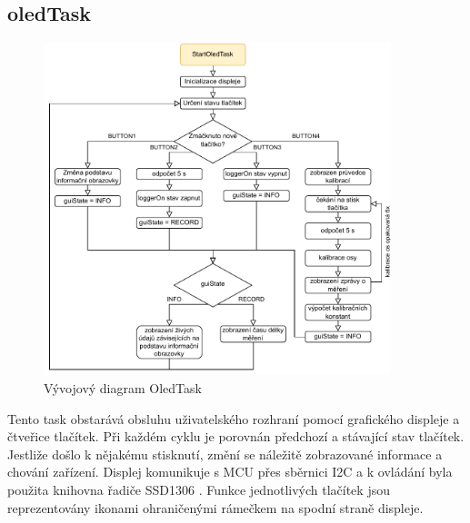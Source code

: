 \subsection{oledTask}
\begin{figure}[h]
    \centering
    \includegraphics[width=0.9\textwidth]{obrazky/OledTask}
    \caption{Vývojový diagram OledTask}
\end{figure}
Tento task obstarává obsluhu uživatelského rozhraní pomocí grafického displeje a čtveřice tlačítek. Při každém cyklu
je porovnán předchozí a stávající stav tlačítek. Jestliže došlo k nějakému stisknutí, změní se náležitě zobrazované informace a chování zařízení. Displej komunikuje s \ac{MCU} přes sběrnici I2C a k ovládání byla použita knihovna řadiče SSD1306 \cite{Alekseev2024}. Funkce jednotlivých tlačítek jsou reprezentovány ikonami ohraničenými rámečkem na spodní straně displeje.

